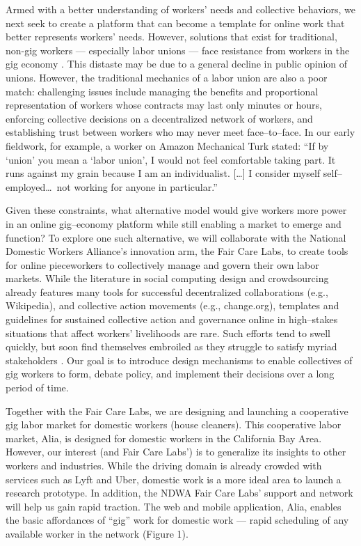 \documentclass[11pt]{article}
\begin{document}
Armed with a better understanding of workers' needs and collective behaviors, we next seek to create a platform that can become a template for online work that better represents workers' needs.
However, solutions that exist for traditional, non-gig workers
--- especially labor unions ---
face resistance from workers in the gig economy
\cite{martin2014being,dynamo}.
This distaste may be due to a general decline in public opinion of unions.
However, the traditional mechanics of a labor union are also a poor match: challenging issues include managing the benefits and proportional representation of workers whose contracts may last only minutes or hours, enforcing collective decisions on a decentralized network of workers, and establishing trust between workers who may never meet face--to--face.
In our early fieldwork, for example, a worker on Amazon Mechanical Turk stated:
``If by `union' you mean a `labor union', I would not feel comfortable taking part.
It runs against my grain because I am an individualist.
[\dots] I consider myself self--employed\dots\  not working for anyone in particular.''

Given these constraints, what alternative model would give workers more power in an online gig--economy platform while still enabling a market to emerge and function? To explore one such alternative, we will collaborate with the National Domestic Workers Alliance's innovation arm, the Fair Care Labs, to create tools for online pieceworkers to collectively manage and govern their own labor markets.
While the literature in social computing design and crowdsourcing already features many tools for successful decentralized collaborations (e.g., Wikipedia), and collective action movements (e.g., change.org), templates and guidelines for sustained collective action and governance online in high--stakes situations that affect workers' livelihoods are rare.
Such efforts tend to swell quickly, but soon find themselves embroiled as they struggle to satisfy myriad stakeholders .
Our goal is to introduce design mechanisms to enable collectives of gig workers to form, debate policy, and implement their decisions over a long period of time.

Together with the Fair Care Labs, we are designing and launching a cooperative gig labor market for domestic workers (house cleaners).
This cooperative labor market, Alia, is designed for domestic workers in the California Bay Area.
However, our interest (and Fair Care Labs') is to generalize its insights to other workers and industries.
While the driving domain is already crowded with services such as Lyft and Uber, domestic work is a more ideal area to launch a research prototype.
In addition, the NDWA Fair Care Labs' support and network will help us gain rapid traction. The web and mobile application, Alia, enables the basic affordances of ``gig'' work for domestic work
--- rapid scheduling of any available worker in the network (Figure 1).
\end{document}
